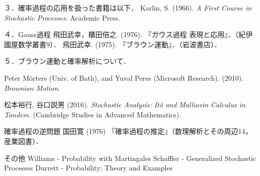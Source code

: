 \documentclass[uplatex,dvipdfmx]{jsreport}
\begin{document}
\begin{thebibliography}{99}
    ３．確率過程の応用を扱った書籍は以下．
    Karlin, S. (1966). \textit{A First Course in Stochastic Processes}. Academic Press.

    ４．Gauss過程
    飛田武幸，櫃田倍之. (1976). 『ガウス過程 表現と応用』．（紀伊國屋数学叢書9）．
    飛田武幸. (1975). 『ブラウン運動』．（岩波書店）．

    ５．ブラウン運動と確率解析について．
    \item
    Peter Mörters (Univ. of Bath), and Yuval Peres (Microsoft Research). (2010). \textit{Brownian Motion}.
    \item
    松本裕行, 谷口説男 (2016). \textit{Stochastic Analysis: Itô and Malliavin Calculus in Tandem}. (Cambridge Studies in Advanced Mathematics).

    確率過程の逆問題
    国田寛 (1976) 『確率過程の推定』（数理解析とその周辺14，産業図書）．

    その他
    Williams - Probability with Martingales
    Schaffler - Generalized Stochastic Processes
    Durrett - Probability: Theory and Examples
\end{thebibliography}
\end{document}

